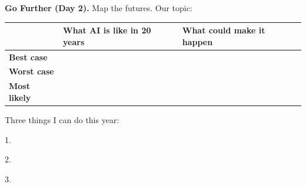\documentclass[11pt]{article}
\begin{document}
\newpage

{\large\textbf{Go Further (Day 2).}} Map the futures. Our topic: 

\vspace{0.3em}
\begin{tabular}{|R{1.4in}|R{2.6in}|R{2.5in}|}
\hline
 & \textbf{What AI is like in 20 years} & \textbf{What could make it happen} \\ \hline
\textbf{Best case} &  & \\[2.2em] \hline
\textbf{Worst case} & & \\[2.2em] \hline
\textbf{Most likely} & & \\[2.2em] \hline
\end{tabular}

\vspace{0.8em}
Three things I can do this year:

\vspace{0.5em}
1. 

\vspace{0.4em}
2. \blank{6.6in}

\vspace{0.4em}
3. \blank{6.6in}
\end{document}
